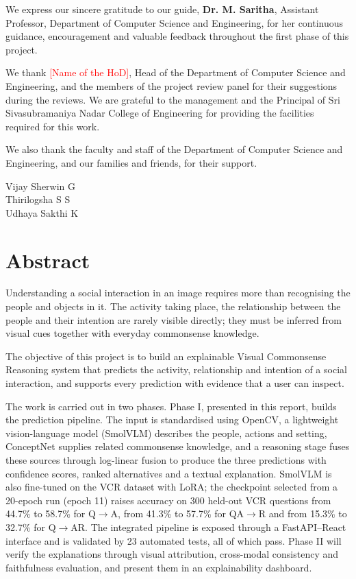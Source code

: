 \documentclass[12pt,a4paper,oneside]{report}
\newcommand{\fillin}[1]{\textcolor{red}{[#1]}}
\newcommand{\QtoA}{Q$\rightarrow$A}
\newcommand{\QAtoR}{QA$\rightarrow$R}
\newcommand{\QtoAR}{Q$\rightarrow$AR}
\newcommand{\guidename}{Dr. M. Saritha}
\newcommand{\guidedesig}{Assistant Professor}
\newcommand{\hodname}{\fillin{Name of the HoD}}
\begin{document}
We express our sincere gratitude to our guide, \textbf{\guidename},
\guidedesig, Department of Computer Science and Engineering, for her continuous
guidance, encouragement and valuable feedback throughout the first phase of
this project.

We thank \hodname, Head of the Department of Computer Science and Engineering,
and the members of the project review panel for their suggestions during the
reviews. We are grateful to the management and the Principal of Sri
Sivasubramaniya Nadar College of Engineering for providing the facilities
required for this work.

We also thank the faculty and staff of the Department of Computer Science and
Engineering, and our families and friends, for their support.

\vspace{1.5cm}
\begin{flushright}
Vijay Sherwin G\\
Thirilogsha S S\\
Udhaya Sakthi K
\end{flushright}

\chapter*{Abstract}

Understanding a social interaction in an image requires more than recognising
the people and objects in it. The activity taking place, the relationship
between the people and their intention are rarely visible directly; they must
be inferred from visual cues together with everyday commonsense knowledge.

The objective of this project is to build an explainable Visual Commonsense
Reasoning system that predicts the activity, relationship and intention of a
social interaction, and supports every prediction with evidence that a user can
inspect.

The work is carried out in two phases. Phase I, presented in this report,
builds the prediction pipeline. The input is standardised using OpenCV, a
lightweight vision-language model (SmolVLM) describes the people, actions and
setting, ConceptNet supplies related commonsense knowledge, and a reasoning
stage fuses these sources through log-linear fusion to produce the three
predictions with confidence scores, ranked alternatives and a textual
explanation. SmolVLM is also fine-tuned on the VCR dataset with LoRA; the
checkpoint selected from a 20-epoch run (epoch 11) raises accuracy on 300
held-out VCR questions from 44.7\% to 58.7\% for \QtoA, from 41.3\% to 57.7\%
for \QAtoR{} and from 15.3\% to 32.7\% for \QtoAR. The integrated pipeline is
exposed through a FastAPI--React interface and is validated by 23 automated
tests, all of which pass. Phase II will verify the explanations through visual
attribution, cross-modal consistency and faithfulness evaluation, and present
them in an explainability dashboard.
\end{document}
